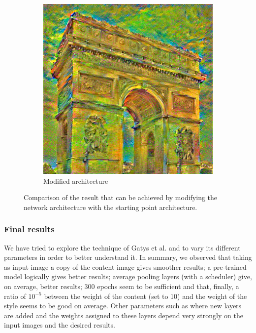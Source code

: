 \documentclass[twocolumn,superscriptaddress,aps,floatfix,nofootinbib]{revtex4-1}
\begin{document}
\begin{figure}[ht]
\begin{subfigure}[b]{0.22\textwidth}
            \includegraphics[width=\textwidth]{resources/png/layers/layers_nicer.png}
            \caption{Modified architecture}
            \label{fig:added.layer.result}
        \end{subfigure}
        \caption{Comparison of the result that can be achieved by modifying the network architecture with the starting point architecture.}
    \end{figure}
    
    \subsubsection{Final results}
    
    We have tried to explore the technique of Gatys et al. and to vary its different parameters in order to better understand it. In summary, we observed that taking as input image a copy of the content image gives smoother results; a pre-trained model logically gives better results; average pooling layers (with a scheduler) give, on average, better results; 300 epochs seem to be sufficient and that, finally, a ratio of $10^{-5}$ between the weight of the content (set to 10) and the weight of the style seems to be good on average. Other parameters such as where new layers are added and the weights assigned to these layers depend very strongly on the input images and the desired results.\\
    
\end{document}
